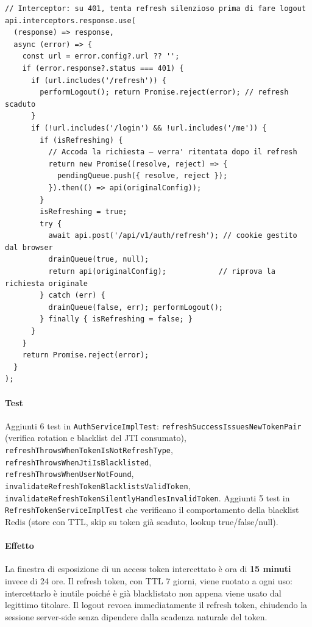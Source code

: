 ﻿\documentclass[a4paper,12pt]{report}
\begin{document}
\begin{securebox}[title={Codice Sicuro --- api.ts (Axios interceptor con silent refresh)}]
\begin{lstlisting}[style=typescript]
// Interceptor: su 401, tenta refresh silenzioso prima di fare logout
api.interceptors.response.use(
  (response) => response,
  async (error) => {
    const url = error.config?.url ?? '';
    if (error.response?.status === 401) {
      if (url.includes('/refresh')) {
        performLogout(); return Promise.reject(error); // refresh scaduto
      }
      if (!url.includes('/login') && !url.includes('/me')) {
        if (isRefreshing) {
          // Accoda la richiesta — verra' ritentata dopo il refresh
          return new Promise((resolve, reject) => {
            pendingQueue.push({ resolve, reject });
          }).then(() => api(originalConfig));
        }
        isRefreshing = true;
        try {
          await api.post('/api/v1/auth/refresh'); // cookie gestito dal browser
          drainQueue(true, null);
          return api(originalConfig);            // riprova la richiesta originale
        } catch (err) {
          drainQueue(false, err); performLogout();
        } finally { isRefreshing = false; }
      }
    }
    return Promise.reject(error);
  }
);
\end{lstlisting}
\end{securebox}

\paragraph{Test} Aggiunti 6 test in \texttt{AuthServiceImplTest}:
\texttt{refreshSuccessIssuesNewTokenPair} (verifica rotation e blacklist del JTI consumato), \\
\texttt{refreshThrowsWhenTokenIsNotRefreshType},
\texttt{refreshThrowsWhenJtiIsBlacklisted},\\
\texttt{refreshThrowsWhenUserNotFound},
\texttt{invalidateRefreshTokenBlacklistsValidToken},\\
\texttt{invalidateRefreshTokenSilentlyHandlesInvalidToken}.
Aggiunti 5 test in \\ \texttt{RefreshTokenServiceImplTest} che verificano il comportamento
della blacklist Redis (store con TTL, skip su token già scaduto, lookup true/false/null).

\paragraph{Effetto}
La finestra di esposizione di un access token intercettato è ora di \textbf{15 minuti}
invece di 24 ore. Il refresh token, con TTL 7 giorni, viene ruotato a ogni uso:
intercettarlo è inutile poiché è già blacklistato non appena viene usato dal legittimo
titolare. Il logout revoca immediatamente il refresh token, chiudendo la sessione
server-side senza dipendere dalla scadenza naturale del token.
\end{document}
